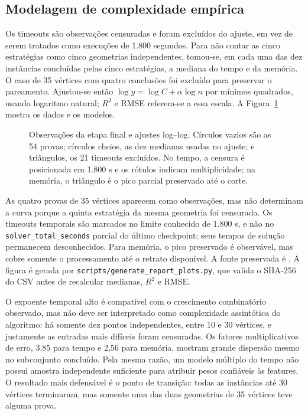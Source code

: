 \documentclass[12pt]{article}
\begin{document}
\subsection{Modelagem de complexidade empírica}

Os timeouts são observações censuradas e foram excluídos do ajuste, em vez de
serem tratados como execuções de 1.800 segundos. Para não contar as cinco
estratégias como cinco geometrias independentes, tomou-se, em cada uma das dez
instâncias concluídas pelas cinco estratégias, a mediana do tempo e da memória.
O caso de 35 vértices com quatro conclusões foi excluído para preservar o
pareamento. Ajustou-se então
$\log y=\log C+\alpha\log n$ por mínimos quadrados, usando logaritmo natural;
$R^2$ e RMSE referem-se a essa escala. A
Figura~\ref{fig:complexity-regressions} mostra os dados e os modelos.

\begin{figure}[H]
  \centering
  \resizebox{\textwidth}{!}{}
  \caption{Observações da etapa final e ajustes log--log. Círculos vazios são as 54
  provas; círculos cheios, as dez medianas usadas no ajuste; e triângulos, os
  21 timeouts excluídos. No tempo, a censura é posicionada em 1.800 s e os
  rótulos indicam multiplicidade; na memória, o triângulo é o pico parcial
  preservado até o corte.}
  \label{fig:complexity-regressions}
\end{figure}

As quatro provas de 35 vértices aparecem como observações, mas não determinam a
curva porque a quinta estratégia da mesma geometria foi censurada. Os timeouts
temporais são marcados no limite conhecido de 1.800 s, e não no
\texttt{solver\_total\_seconds} parcial do último checkpoint; seus tempos de
solução permanecem desconhecidos. Para memória, o pico preservado é observável,
mas cobre somente o processamento até o retrato disponível. A fonte preservada
é . A figura é gerada por
\texttt{scripts/generate\_report\_plots.py}, que valida o SHA-256 do CSV antes
de recalcular medianas, $R^2$ e RMSE.

O expoente temporal alto é compatível com o crescimento combinatório observado,
mas não deve ser interpretado como complexidade assintótica do algoritmo: há
somente dez pontos independentes, entre 10 e 30 vértices, e justamente as
entradas mais difíceis foram censuradas. Os fatores multiplicativos de erro,
3,85 para tempo e 2,56 para memória, mostram grande dispersão mesmo no
subconjunto concluído. Pela mesma razão, um modelo múltiplo do tempo não possui
amostra independente suficiente para atribuir pesos confiáveis às features. O
resultado mais defensável é o ponto de transição: todas as instâncias até 30
vértices terminaram, mas somente uma das duas geometrias de 35 vértices teve
alguma prova.
\end{document}
